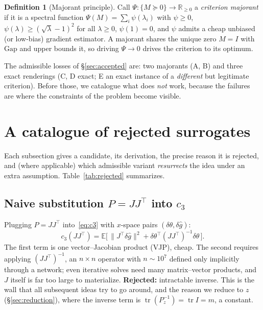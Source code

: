 \documentclass[11pt]{article}
\theoremstyle{plain}
\theoremstyle{definition}
\newtheorem{definition}{Definition}
\theoremstyle{remark}
\DeclareMathOperator{\tr}{tr}
\newcommand{\R}{\mathbb{R}}
\newcommand{\E}{\mathbb{E}}
\newcommand{\norm}[1]{\lVert #1 \rVert}
\begin{document}
\begin{definition}[Majorant principle]
\label{def:majorant}
Call $\Psi\colon\{M\succeq0\}\to\R_{\ge0}$ a \emph{criterion majorant} if it is a spectral
function $\Psi(M)=\sum_i\psi(\lambda_i)$ with $\psi\ge0$, $\psi(\lambda)\ge(\sqrt\lambda-1)^2$
for all $\lambda\ge0$, $\psi(1)=0$, and $\psi$ admits a cheap unbiased (or low-bias)
gradient estimator. A majorant shares the unique zero $M=I$ with $\mathrm{Gap}$ and upper
bounds it, so driving $\Psi\to0$ drives the criterion to its optimum.
\end{definition}

The admissible losses of \S\ref{sec:accepted} are: two majorants (A, B) and three exact
renderings (C, D exact; E an exact instance of a \emph{different} but legitimate criterion).
Before those, we catalogue what does \emph{not} work, because the failures are where the
constraints of the problem become visible.

\section{A catalogue of rejected surrogates}
\label{sec:rejected}

Each subsection gives a candidate, its derivation, the precise reason it is rejected, and
(where applicable) which admissible variant \emph{resurrects} the idea under an extra
assumption. Table~\ref{tab:rejected} summarizes.

\subsection{Naive substitution $P=JJ^{\!\top}$ into $c_3$}
\label{sub:naive}
Plugging $P=JJ^{\!\top}$ into~\eqref{eq:c3} with $x$-space pairs $(\delta\theta,\delta\hat g)$:
\begin{equation}
  c_3(JJ^{\!\top})=\E\big[\,\norm{J^{\!\top}\delta\hat g}^2
   +\delta\theta^{\!\top}(JJ^{\!\top})^{-1}\delta\theta\,\big].
\end{equation}
The first term is one vector--Jacobian product (VJP), cheap. The second requires applying
$(JJ^{\!\top})^{-1}$, an $n\times n$ operator with $n\sim10^7$ defined only implicitly
through a network; even iterative solves need many matrix--vector products, and $J$ itself
is far too large to materialize. \textbf{Rejected:} intractable inverse. This is the wall
that all subsequent ideas try to go around, and the reason we reduce to $z$
(\S\ref{sec:reduction}), where the inverse term is $\tr(P_z^{-1})=\tr I=m$, a constant.
\end{document}
